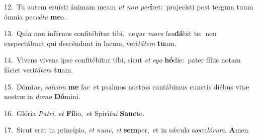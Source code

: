 {\numbfont\textcolor{\numbcolor}{12.}}~Tu autem eruísti ánimam meam \textit{ut} \textit{non} \textit{per}\-\textbf{í}ret:~\star projecísti post tergum tuum ómnia pec\-\textit{cá}\-\textit{ta} \textbf{me}\-a.\par
{\numbfont\textcolor{\numbcolor}{13.}}~Quia non inférnus confitébitur tibi,~\dagger ne\textit{que} \textit{mors} \textit{lau}\-\textbf{dá}bit te:~\star non exspectábunt qui descéndunt in lacum, veri\-\textit{tá}\-\textit{tem} \textbf{tu}\-am.\par
{\numbfont\textcolor{\numbcolor}{14.}}~Vivens vivens ipse confitébitur tibi, sicut \textit{et} \textit{e}\-\textit{go} \textbf{hó}\-die:~\star pater fíliis notam fáciet veri\-\textit{tá}\-\textit{tem} \textbf{tu}\-am.\par
{\numbfont\textcolor{\numbcolor}{15.}}~Dómi\-\textit{ne}\-, \textit{sal}\-\textit{vum} \textbf{me} fac~\star et psalmos nostros cantábimus cunctis diébus vitæ nostræ in \textit{do}\-\textit{mo} \textbf{Dó}\-mini.\par
{\numbfont\textcolor{\numbcolor}{16.}}~Glória \textit{Pa}\-\textit{tri}, \textit{et} \textbf{Fí}\-lio,~\star et Spirí\-\textit{tu}\-\textit{i} \textbf{Sanc}\-to.\par
{\numbfont\textcolor{\numbcolor}{17.}}~Sicut erat in princípio, \textit{et} \textit{nunc}\-, \textit{et} \textbf{sem}\-per,~\star et in sǽcula sæcu\-\textit{ló}\-\textit{rum}. \textbf{A}\-men.\par
